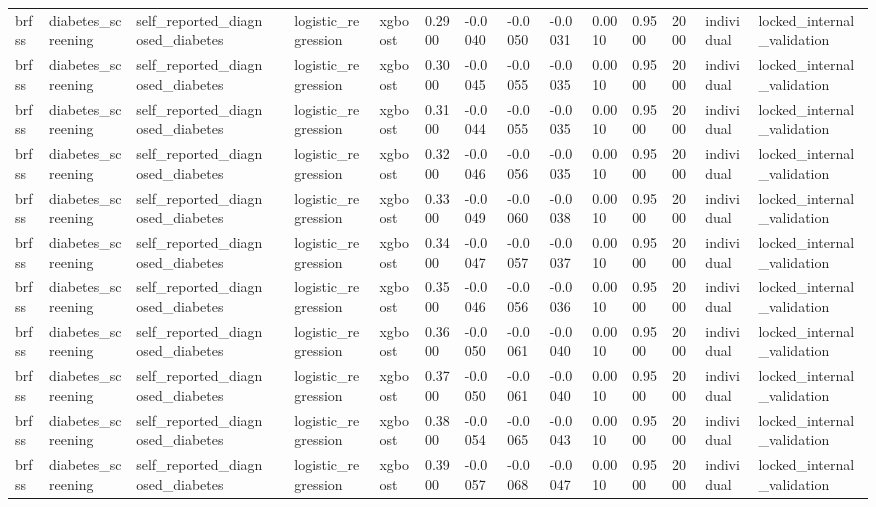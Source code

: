 \begin{tabular}{lllllllllllllll}
brfss & diabetes\_screening & self\_reported\_diagnosed\_diabetes &  & logistic\_regression & xgboost & 0.2900 & -0.0040 & -0.0050 & -0.0031 & 0.0010 & 0.9500 & 2000 & individual & locked\_internal\_validation \\
brfss & diabetes\_screening & self\_reported\_diagnosed\_diabetes &  & logistic\_regression & xgboost & 0.3000 & -0.0045 & -0.0055 & -0.0035 & 0.0010 & 0.9500 & 2000 & individual & locked\_internal\_validation \\
brfss & diabetes\_screening & self\_reported\_diagnosed\_diabetes &  & logistic\_regression & xgboost & 0.3100 & -0.0044 & -0.0055 & -0.0035 & 0.0010 & 0.9500 & 2000 & individual & locked\_internal\_validation \\
brfss & diabetes\_screening & self\_reported\_diagnosed\_diabetes &  & logistic\_regression & xgboost & 0.3200 & -0.0046 & -0.0056 & -0.0035 & 0.0010 & 0.9500 & 2000 & individual & locked\_internal\_validation \\
brfss & diabetes\_screening & self\_reported\_diagnosed\_diabetes &  & logistic\_regression & xgboost & 0.3300 & -0.0049 & -0.0060 & -0.0038 & 0.0010 & 0.9500 & 2000 & individual & locked\_internal\_validation \\
brfss & diabetes\_screening & self\_reported\_diagnosed\_diabetes &  & logistic\_regression & xgboost & 0.3400 & -0.0047 & -0.0057 & -0.0037 & 0.0010 & 0.9500 & 2000 & individual & locked\_internal\_validation \\
brfss & diabetes\_screening & self\_reported\_diagnosed\_diabetes &  & logistic\_regression & xgboost & 0.3500 & -0.0046 & -0.0056 & -0.0036 & 0.0010 & 0.9500 & 2000 & individual & locked\_internal\_validation \\
brfss & diabetes\_screening & self\_reported\_diagnosed\_diabetes &  & logistic\_regression & xgboost & 0.3600 & -0.0050 & -0.0061 & -0.0040 & 0.0010 & 0.9500 & 2000 & individual & locked\_internal\_validation \\
brfss & diabetes\_screening & self\_reported\_diagnosed\_diabetes &  & logistic\_regression & xgboost & 0.3700 & -0.0050 & -0.0061 & -0.0040 & 0.0010 & 0.9500 & 2000 & individual & locked\_internal\_validation \\
brfss & diabetes\_screening & self\_reported\_diagnosed\_diabetes &  & logistic\_regression & xgboost & 0.3800 & -0.0054 & -0.0065 & -0.0043 & 0.0010 & 0.9500 & 2000 & individual & locked\_internal\_validation \\
brfss & diabetes\_screening & self\_reported\_diagnosed\_diabetes &  & logistic\_regression & xgboost & 0.3900 & -0.0057 & -0.0068 & -0.0047 & 0.0010 & 0.9500 & 2000 & individual & locked\_internal\_validation \\

\end{tabular}
